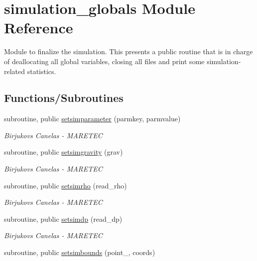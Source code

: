 \hypertarget{namespacesimulation__globals}{}\section{simulation\+\_\+globals Module Reference}
\label{namespacesimulation__globals}


Module to finalize the simulation. This presents a public routine that is in charge of deallocating all global variables, closing all files and print some simulation-\/related statistics.  


\subsection*{Functions/\+Subroutines}
\begin{DoxyCompactItemize}
\item 
subroutine, public \mbox{\hyperlink{namespacesimulation__globals_a7a127d09219ed57ad8db3507dbbefe5b}{setsimparameter}} (parmkey, parmvalue)
\begin{DoxyCompactList}\small\item\em Birjukovs Canelas -\/ M\+A\+R\+E\+T\+EC \end{DoxyCompactList}\item 
subroutine, public \mbox{\hyperlink{namespacesimulation__globals_abe9252e2e73b8a074700d49b705664ef}{setsimgravity}} (grav)
\begin{DoxyCompactList}\small\item\em Birjukovs Canelas -\/ M\+A\+R\+E\+T\+EC \end{DoxyCompactList}\item 
subroutine, public \mbox{\hyperlink{namespacesimulation__globals_acb970c567557ee852be95afe8d3f2b0f}{setsimrho}} (read\+\_\+rho)
\begin{DoxyCompactList}\small\item\em Birjukovs Canelas -\/ M\+A\+R\+E\+T\+EC \end{DoxyCompactList}\item 
subroutine, public \mbox{\hyperlink{namespacesimulation__globals_a279b7a2988da04ca81146f0a8f154ca9}{setsimdp}} (read\+\_\+dp)
\begin{DoxyCompactList}\small\item\em Birjukovs Canelas -\/ M\+A\+R\+E\+T\+EC \end{DoxyCompactList}\item 
subroutine, public \mbox{\hyperlink{namespacesimulation__globals_a8e4aaa3352a4aa807b5cdf0a537c13e8}{setsimbounds}} (point\+\_\+, coords)

\end{DoxyCompactItemize}
